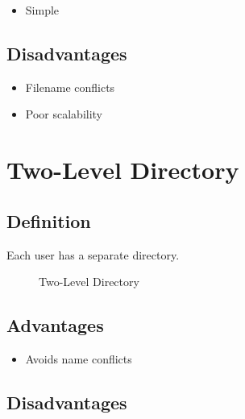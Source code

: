 \begin{itemize}
\item Simple
\end{itemize}

\subsection{Disadvantages}

\begin{itemize}
\item Filename conflicts
\item Poor scalability
\end{itemize}

\section{Two-Level Directory}

\subsection{Definition}

Each user has a separate directory.

\begin{figure}[h]
\centering
{}
\caption{Two-Level Directory}
\end{figure}

\subsection{Advantages}

\begin{itemize}
\item Avoids name conflicts
\end{itemize}

\subsection{Disadvantages}

